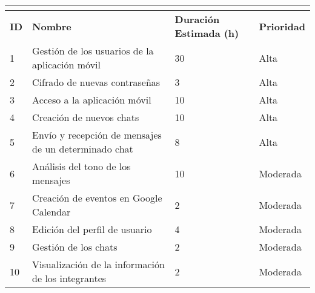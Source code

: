 \begin{tabular}{|l|l|l|l|}
	\hline
	\multicolumn{4}{|c|}{\cellcolor[HTML]{343434}{\color[HTML]{FFFFFF} \textbf{Pila de Producto}}} \\ \hline
	\textbf{ID}              & \textbf{Nombre}              & \textbf{Duración Estimada (h)}             & \textbf{Prioridad}             \\ \hline
	1               & Gestión de los usuarios de la aplicación móvil                   & 30                               & Alta                      \\ \hline
	2               & Cifrado de nuevas contraseñas                    & 3                               & Alta                      \\ \hline
	3               & Acceso a la aplicación móvil                    & 10                               & Alta                      \\ \hline
	4               & Creación de nuevos chats   & 10            & Alta                      \\ \hline
	5               & Envío y recepción de mensajes de un determinado chat                    & 8                     & Alta                      \\ \hline
	6               & Análisis del tono de los mensajes                    & 10                               & Moderada                      \\ \hline
	7               & Creación de eventos en Google Calendar                    & 2                               & Moderada                  \\ \hline
	8               & Edición del perfil de usuario                    & 4                               & Moderada                      \\ \hline
	9               & Gestión de los chats                    & 2                               & Moderada                      \\ \hline
	10               & Visualización de la información de los integrantes           & 2                & Moderada                      \\ \hline
\end{tabular}